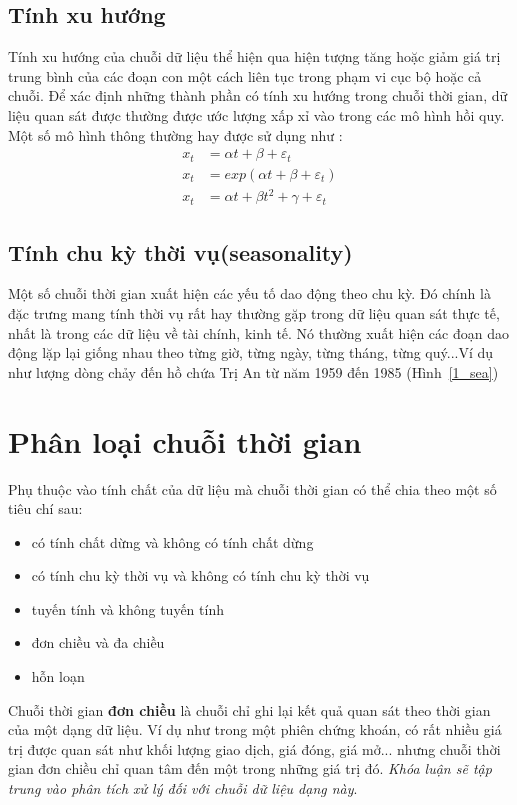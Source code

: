 \subsection{Tính xu hướng} 
Tính xu hướng của chuỗi dữ liệu thể hiện qua hiện tượng tăng hoặc giảm giá trị trung bình của các đoạn con một cách liên tục trong phạm vi cục bộ hoặc cả chuỗi. Để xác định những thành phần có tính xu hướng trong chuỗi thời gian, dữ liệu quan sát được thường được ước lượng xấp xỉ vào trong các mô hình hồi quy. Một số mô hình thông thường hay được sử dụng như :
\begin{align}
	x_t &= \alpha{t}+ \beta + \varepsilon_t \\
	x_t &= exp(\alpha{t}+ \beta + \varepsilon_t) \\
	x_t &= \alpha{t} + \beta{t}^{2} + \gamma + \varepsilon_t
\end{align}
\subsection{Tính chu kỳ thời vụ(seasonality)}
Một số chuỗi thời gian xuất hiện các yếu tố dao động theo chu kỳ. Đó chính là đặc trưng mang tính thời vụ rất hay thường gặp trong dữ liệu quan sát thực tế, nhất là trong các dữ liệu về tài chính, kinh tế. Nó thường xuất hiện các đoạn dao động lặp lại giống nhau theo từng giờ, từng ngày, từng tháng, từng quý...Ví dụ như lượng dòng chảy đến hồ chứa Trị An từ năm 1959 đến 1985 (Hình~\ref{1_sea})

\section{Phân loại chuỗi thời gian}
Phụ thuộc vào tính chất của dữ liệu mà chuỗi thời gian có thể chia theo một số tiêu chí\citep{cits} sau:
\begin{itemize}
	\item có tính chất dừng và không có tính chất dừng
	\item có tính chu kỳ thời vụ và không có tính chu kỳ thời vụ
	\item tuyến tính và không tuyến tính
	\item đơn chiều và đa chiều
	\item hỗn loạn
\end{itemize}
Chuỗi thời gian \textbf{đơn chiều} là chuỗi chỉ ghi lại  kết quả quan sát theo thời gian của một dạng dữ liệu. Ví dụ như trong một phiên chứng khoán, có rất nhiều giá trị được quan sát như khối lượng giao dịch, giá đóng, giá mở... nhưng chuỗi thời gian đơn chiều chỉ quan tâm đến một trong những giá trị đó. \textit{Khóa luận sẽ tập trung vào phân tích xử lý đối với chuỗi dữ liệu dạng này}. 

